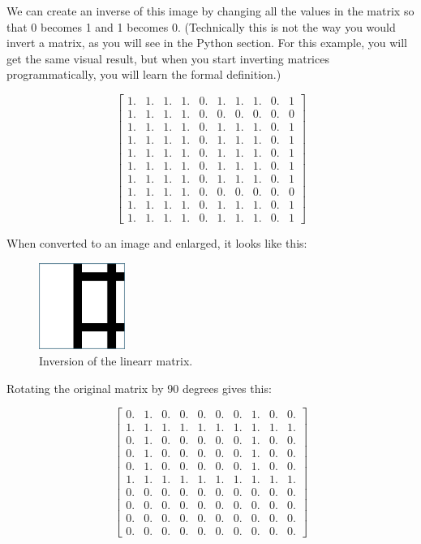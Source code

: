 We can create an inverse of this image by changing all the values in the matrix 
so that 0 becomes 1 and 1 becomes 0. (Technically this is not the way you would 
invert a matrix, as you will see in the Python section. For this example, you 
will get the same visual result, but when you start inverting matrices 
programmatically, you will learn the formal definition.)

$$\begin{bmatrix}
1. & 1. & 1. & 1. & 0. & 1. & 1. & 1. & 0. & 1\\
1. & 1. & 1. & 1. & 0. & 0. & 0. & 0. & 0. & 0\\
1. & 1. & 1. & 1. & 0. & 1. & 1. & 1. & 0. & 1\\
1. & 1. & 1. & 1. & 0. & 1. & 1. & 1. & 0. & 1\\
1. & 1. & 1. & 1. & 0. & 1. & 1. & 1. & 0. & 1\\
1. & 1. & 1. & 1. & 0. & 1. & 1. & 1. & 0. & 1\\
1. & 1. & 1. & 1. & 0. & 1. & 1. & 1. & 0. & 1\\
1. & 1. & 1. & 1. & 0. & 0. & 0. & 0. & 0. & 0\\
1. & 1. & 1. & 1. & 0. & 1. & 1. & 1. & 0. & 1\\
1. & 1. & 1. & 1. & 0. & 1. & 1. & 1. & 0. & 1
\end{bmatrix}$$

When converted to an image and enlarged, it looks like this:

\begin{figure}[htbp]
    \centering
    \includegraphics[width=0.25\textwidth]{inverse.png}
    \caption{Inversion of the linearr matrix.}
    \label{fig:example}
\end{figure}

Rotating the original matrix by 90 degrees gives this:

$$\begin{bmatrix}
0. & 1. & 0. & 0. & 0. & 0. & 0. & 1. & 0. & 0.\\
1. & 1. & 1. & 1. & 1. & 1. & 1. & 1. & 1. & 1.\\
0. & 1. & 0. & 0. & 0. & 0. & 0. & 1. & 0. & 0.\\
0. & 1. & 0. & 0. & 0. & 0. & 0. & 1. & 0. & 0.\\
0. & 1. & 0. & 0. & 0. & 0. & 0. & 1. & 0. & 0.\\
1. & 1. & 1. & 1. & 1. & 1. & 1. & 1. & 1. & 1.\\
0. & 0. & 0. & 0. & 0. & 0. & 0. & 0. & 0. & 0.\\
0. & 0. & 0. & 0. & 0. & 0. & 0. & 0. & 0. & 0.\\
0. & 0. & 0. & 0. & 0. & 0. & 0. & 0. & 0. & 0.\\
0. & 0. & 0. & 0. & 0. & 0. & 0. & 0. & 0. & 0.
\end{bmatrix}$$

